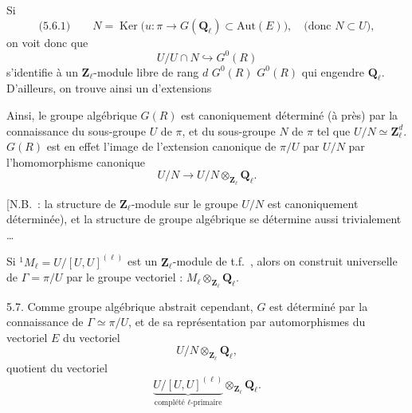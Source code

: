 \documentclass[11pt,a4paper]{article}
\begin{document}
Si
\[ \text{(5.6.1)} \qquad N = \operatorname{Ker}\bigl(u : \pi \longrightarrow G(\mathbf{Q}_{\ell}) \subset \mathrm{Aut}(E)\bigr), \quad \text{(donc $N \subset U$)}, \]
on voit donc que
\[ U/U \cap N \hookrightarrow G^{0}(R) \]
s'identifie à un $\mathbf{Z}_{\ell}$-module libre de rang $d$  $G^{0}(R)$    $G^{0}(R)$ qui engendre $\mathbf{Q}_{\ell}$. D'ailleurs, on trouve ainsi un  d'extensions


Ainsi, le \struck{\ill{}} groupe algébrique $G(R)$ est \struck{\ill{}} canoniquement déterminé  (à   près) par la connaissance du sous-groupe $U$ de $\pi$, et du  sous-groupe $N$ de $\pi$ tel que $U/N \simeq \mathbf{Z}_{\ell}^{d}$. $G(R)$ est en effet l'image de l'extension canonique de $\pi/U$ par $U/N$ \struck{\ill{}} par l'homomorphisme canonique
\[ U/N \longrightarrow U/N \otimes_{\mathbf{Z}_{\ell}} \mathbf{Q}_{\ell} . \]

[N.B.\ : la structure de $\mathbf{Z}_{\ell}$-module sur le groupe  $U/N$ est canoniquement déterminée), et la structure de groupe algébrique se détermine aussi trivialement …

Si ${}^{1}M_{\ell} = U/[U,U]^{(\ell)}$  est un $\mathbf{Z}_{\ell}$-module de t.f.\ , alors on construit  \struck{\ill{}} \add{\ill{}}  universelle de $\Gamma = \pi/U$ par le groupe vectoriel  : $M_{\ell} \otimes_{\mathbf{Z}_{\ell}} \mathbf{Q}_{\ell}$.

5.7. Comme groupe algébrique abstrait cependant, $G$ est déterminé par la connaissance de $\Gamma \simeq \pi/U$, et de sa représentation par automorphismes du vectoriel  $E$ \struck{\ill{}} du vectoriel
\[ U/N \otimes_{\mathbf{Z}_{\ell}} \mathbf{Q}_{\ell} , \]
quotient du vectoriel
\[ \underbrace{U/[U,U]^{(\ell)}}_{\text{complété $\ell$-primaire}} \otimes_{\mathbf{Z}_{\ell}} \mathbf{Q}_{\ell} . \]
\end{document}
